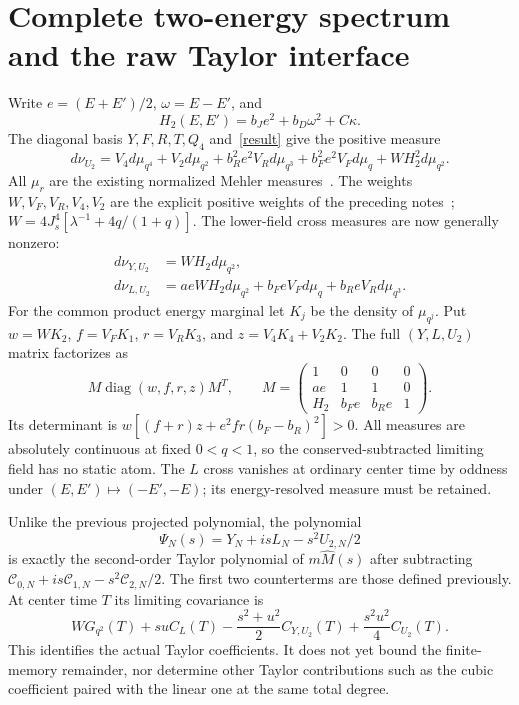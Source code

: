\documentclass[11pt,a4paper]{article}
\newcommand{\J}{J_s}
\begin{document}
\newpage
\section{Complete two-energy spectrum and the raw Taylor interface}
Write $e=(E+E')/2$, $\omega=E-E'$, and
\begin{equation}
 H_2(E,E')=b_Je^2+b_D\omega^2+C\kappa. \label{mult}
\end{equation}
The diagonal basis $Y,F,R,T,Q_4$ and~\eqref{result} give the positive measure
\begin{equation}
 \boxed{\ d\nu_{U_2}=V_4d\mu_{q^4}+V_2d\mu_{q^2}
       +b_R^2e^2V_Rd\mu_{q^3}+b_F^2e^2V_Fd\mu_q
       +W H_2^2d\mu_{q^2}.\ } \label{spectrum}
\end{equation}
All $\mu_r$ are the existing normalized Mehler measures~\cite{TT,BNR}.
The weights $W,V_F,V_R,V_4,V_2$ are the explicit positive weights
of the preceding notes~\cite{mixed}; $W=4\J^4[\lambda^{-1}+4q/(1+q)]$.
The lower-field cross measures are now generally nonzero:
\begin{align}
 d\nu_{Y,U_2}&=W H_2d\mu_{q^2},\\
 d\nu_{L,U_2}&=aeW H_2d\mu_{q^2}
                  +b_FeV_Fd\mu_q+b_ReV_Rd\mu_{q^3}.
\end{align}
For the common product energy marginal let $K_j$ be the density
of $\mu_{q^j}$. Put $w=WK_2$, $f=V_FK_1$, $r=V_RK_3$, and
$z=V_4K_4+V_2K_2$. The full $(Y,L,U_2)$ matrix factorizes as
\begin{equation}
 M\operatorname{diag}(w,f,r,z)M^T,\qquad
 M=\begin{pmatrix}1&0&0&0\\ae&1&1&0\\H_2&b_Fe&b_Re&1\end{pmatrix}.
\end{equation}
Its determinant is $w[(f+r)z+e^2fr(b_F-b_R)^2]>0$.
All measures are absolutely continuous at fixed $0<q<1$, so the
conserved-subtracted limiting field has no static atom.
The $L$ cross vanishes at ordinary center time by oddness under
$(E,E')\mapsto(-E',-E)$; its energy-resolved measure must be retained.

Unlike the previous projected polynomial, the polynomial
\begin{equation}
 \Psi_N(s)=Y_N+isL_N-s^2U_{2,N}/2
\end{equation}
is exactly the second-order Taylor polynomial of $m\widehat M(s)$
after subtracting $\mathcal C_{0,N}+is\mathcal C_{1,N}
-s^2\mathcal C_{2,N}/2$. The first two counterterms are those
defined previously. At center time $T$ its limiting covariance is
\begin{equation}
 WG_{q^2}(T)+suC_L(T)
 -\frac{s^2+u^2}{2}C_{Y,U_2}(T)+\frac{s^2u^2}{4}C_{U_2}(T).
\end{equation}
This identifies the actual Taylor coefficients. It does not yet
bound the finite-memory remainder, nor determine other Taylor
contributions such as the cubic coefficient paired with the
linear one at the same total degree.
\end{document}
